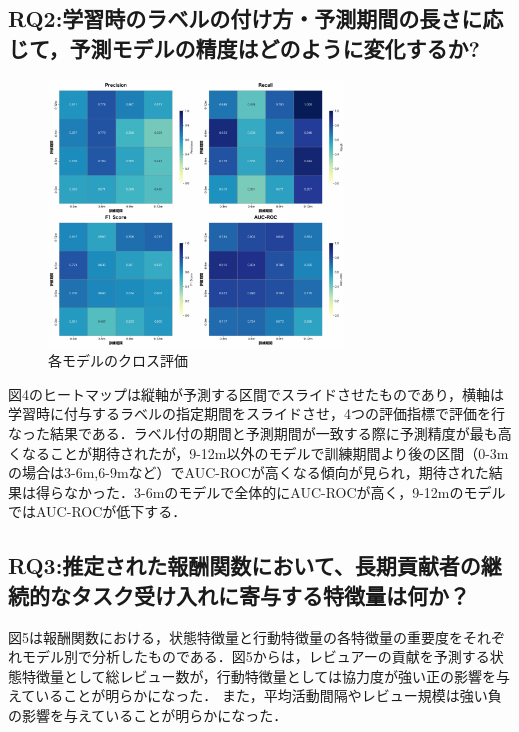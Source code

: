 \documentclass[submit,techrep,noauthor]{ipsj}
\begin{document}
\subsection{RQ2:学習時のラベルの付け方・予測期間の長さに応じて，予測モデルの精度はどのように変化するか?}
\begin{figure}[t]
    \centering
\includegraphics[width=0.7\textwidth]{./Hashimoto_fig/heatmap.pdf}
    \caption{各モデルのクロス評価}
    \label{fig:result}
\end{figure}

図4のヒートマップは縦軸が予測する区間でスライドさせたものであり，横軸は学習時に付与するラベルの指定期間をスライドさせ，4つの評価指標で評価を行なった結果である．ラベル付の期間と予測期間が一致する際に予測精度が最も高くなることが期待されたが，9-12m以外のモデルで訓練期間より後の区間（0-3mの場合は3-6m,6-9mなど）でAUC-ROCが高くなる傾向が見られ，期待された結果は得らなかった．3-6mのモデルで全体的にAUC-ROCが高く，9-12mのモデルではAUC-ROCが低下する．

\subsection{RQ3:推定された報酬関数において、長期貢献者の継続的なタスク受け入れに寄与する特徴量は何か？}
図5は報酬関数における，状態特徴量と行動特徴量の各特徴量の重要度をそれぞれモデル別で分析したものである．図5からは，レビュアーの貢献を予測する状態特徴量として総レビュー数が，行動特徴量としては協力度が強い正の影響を与えていることが明らかになった．
また，平均活動間隔やレビュー規模は強い負の影響を与えていることが明らかになった．
\end{document}
